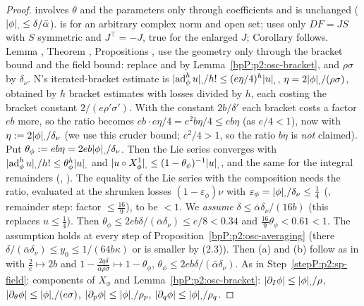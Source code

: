 \begin{proof}
\label{stepP:p2:oi-transfer}  involves $\theta$ and the parameters only through coefficients and is unchanged ($\lvert \phi\rvert_{,}\le\delta/\bar\alpha$).  is for an arbitrary complex norm and open set;  uses only $DF=JS$ with $S$ symmetric and $J^\top=-J$, true for the enlarged $J$; Corollary  follows. Lemma , Theorem , Propositions ,  use the geometry only through the bracket bound and the field bound: replace  and  by Lemma~\ref{bpP:p2:osc-bracket}, and $\rho\sigma$ by $\delta_\nu$.
\label{stepP:p2:oi-ratio} N's iterated-bracket estimate is $\lvert \operatorname{ad}^h_\phi u\rvert_{,}/h!\le(e\eta/4)^h\lvert u\rvert_{,}$, $\eta=2\lvert \phi\rvert_{,}/(\rho\sigma)$, obtained by $h$ bracket estimates with losses divided by $h$, each costing the bracket constant $2/(e\rho'\sigma')$. With the constant $2b/\delta'$ each bracket costs a factor $eb$ more, so the ratio becomes $e b\cdot e\eta/4=e^2b\eta/4\le eb\eta$ (as $e/4<1$), now with $\eta:=2\lvert \phi\rvert_{,}/\delta_\nu$ (we use this cruder bound; $e^2/4>1$, so the ratio $b\eta$ is \emph{not} claimed). Put $\theta_\phi:=eb\eta=2eb\lvert \phi\rvert_{,}/\delta_\nu$. Then the Lie series converges with $\lvert \operatorname{ad}^h_\phi u\rvert_{,}/h!\le\theta_\phi^h\lvert u\rvert_{,}$ and $\lvert u\circ X^1_\phi\rvert_{,}\le(1-\theta_\phi)^{-1}\lvert u\rvert_{,}$, and the same for the integral remainders (, ).
\label{stepP:p2:oi-range} The equality of the Lie series with the composition needs the ratio, evaluated at the shrunken losses $(1-\varepsilon_\phi)\nu$ with $\varepsilon_\phi=\lvert \phi\rvert_{,}/\delta_\nu\le\frac14$ (, remainder step: factor $\le\frac{16}9$), to be $<1$. We \emph{assume} $\delta\le\bar\alpha\delta_\nu/(16b)$ (this replaces $u\le\frac14$). Then $\theta_\phi\le2eb\delta/(\bar\alpha\delta_\nu)\le e/8<0.34$ and $\frac{16}9\theta_\phi<0.61<1$. The assumption holds at every step of Proposition~\ref{bpP:p2:osc-averaging} (there $\delta/(\bar\alpha\delta_\nu)\le y_0\le1/(64b\kappa)$ or is smaller by (2.3)). Then (a) and (b) follow as in  with $\frac2e\mapsto2b$ and $1-\frac{2q\delta}{\bar\alpha\rho\sigma}\mapsto1-\theta_\phi$, $\theta_\phi\le 2eb\delta/(\bar\alpha\delta_\nu)$.
\label{stepP:p2:oi-disp} As in Step~\ref{stepP:p2:sp-field}: components of $X_\phi$ and Lemma~\ref{bpP:p2:osc-bracket}: $\lvert \partial_I\phi\rvert\le\lvert \phi\rvert_{,}/\rho$, $\lvert \partial_\theta\phi\rvert\le\lvert \phi\rvert_{,}/(e\sigma)$, $\lvert \partial_p\phi\rvert\le\lvert \phi\rvert_{,}/\rho_p$, $\lvert \partial_q\phi\rvert\le\lvert \phi\rvert_{,}/\rho_q$.
\end{proof}


